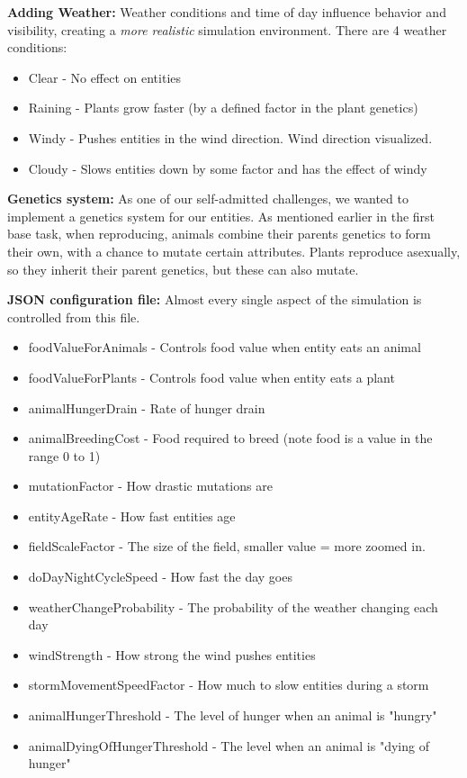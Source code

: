 \documentclass[10pt, a4paper]{scrartcl}
\begin{document}
\begin{multicols}{2}
    \noindent \textbf{Adding Weather:} Weather conditions and time of day influence behavior and visibility,
    creating a \textit{more realistic} simulation environment. There are 4 weather conditions:
    \begin{itemize}
      \item Clear - No effect on entities
      \item Raining - Plants grow faster (by a defined factor in the plant genetics)
      \item Windy - Pushes entities in the wind direction. Wind direction visualized.
      \item Cloudy - Slows entities down by some factor and has the effect of windy
    \end{itemize}

    \noindent \textbf{Genetics system:} As one of our self-admitted challenges, we wanted to implement a genetics system for our entities. As mentioned earlier in the first base task, when reproducing, animals combine their parents genetics to form their own, with a chance to mutate certain attributes. Plants reproduce asexually, so they inherit their parent genetics, but these can also mutate.

    \noindent \textbf{JSON configuration file: } Almost every single aspect of the simulation is controlled from this file.
    \begin{itemize}
      \item foodValueForAnimals - Controls food value when entity eats an animal
      \item foodValueForPlants - Controls food value when entity eats a plant
      \item animalHungerDrain - Rate of hunger drain
      \item animalBreedingCost - Food required to breed (note food is a value in the range 0 to 1)
      \item mutationFactor - How drastic mutations are
      \item entityAgeRate - How fast entities age
      \item fieldScaleFactor  - The size of the field, smaller value = more zoomed in.
      \item doDayNightCycleSpeed - How fast the day goes
      \item weatherChangeProbability - The probability of the weather changing each day
      \item windStrength - How strong the wind pushes entities
      \item stormMovementSpeedFactor - How much to slow entities during a storm
      \item animalHungerThreshold -  The level of hunger when an animal is "hungry"
      \item animalDyingOfHungerThreshold - The level when an animal is "dying of hunger"
    \end{itemize}


\end{multicols}
\end{document}
